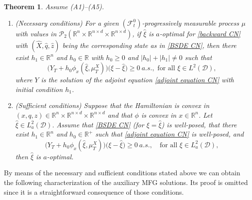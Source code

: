 \documentclass[11pt,a4paper]{article}
\newtheorem{theo}{Theorem}[section]
\begin{document}
\begin{theo}
\label{Necessary Sufficient Condition CN}
Assume \emph{(A1)--(A5)}.
\begin{enumerate}
\item[(i)] (Necessary conditions) For a given \( (\mathcal{F}_t^0) \)-progressively measurable process \( \mu \) with values in \( \mathcal{P}_2(\mathbb{R}^n \times \mathbb{R}^{n\times d} \times \mathbb{R}^{n \times d}) \), if $\hat \xi$ is $a$-optimal for \eqref{backward CN} with $(\hat X,\hat q,\hat z)$ being the corresponding state as in \eqref{BSDE CN}, then there exist $h_1 \in \mathbb{R}^n$ and $h_0 \in \mathbb{R}$ with $h_0 \geq 0$ and $|h_0|+|h_1|\neq 0$  such that 
\begin{equation}
    \label{main condition CN}
        \big(Y_T+h_0\phi_x(\hat \xi,\mu_T^X)\big)\big(\xi-\hat \xi\big)  \geq0 \ a.s., \text{ for all } \xi \in L^2(\mathcal{D}),
    \end{equation}
    where $Y$ is the solution of the adjoint equation \eqref{adjoint equation CN} with initial condition $h_1$.
\item[(ii)] (Sufficient conditions) Suppose that the Hamiltonian is convex in  $(x, q,z) \in \mathbb R^n \times \mathbb R^{n \times d} \times \mathbb R^{n \times d}$ and that $\phi$ is convex in $x \in \mathbb R^n$. 
Let $\hat \xi \in L^2_a (\mathcal D)$. Assume that \eqref{BSDE CN} (for $\xi = \hat \xi$) is well-posed, that there exist $h_1 \in \mathbb{R}^n$ and $h_0 \in \mathbb{R}^+$ such that \eqref{adjoint equation CN} is well-posed, and
    \begin{equation}
    \label{optimality condition CN}
        \big( Y_T+h_0\phi_x(\hat \xi, \mu_T^X)\big) \big(\xi-\hat \xi \big)\geq0 \ a.s., \quad \textrm{for all }\xi \in L^2_a(\mathcal{D}),
    \end{equation}
then $\hat\xi$ is $a$-optimal.
\end{enumerate}
\end{theo}


By means of the necessary and sufficient conditions stated above we can obtain the following characterization of the auxiliary MFG solutions. Its proof is omitted since it is a straightforward consequence of those conditions. 
\end{document}
